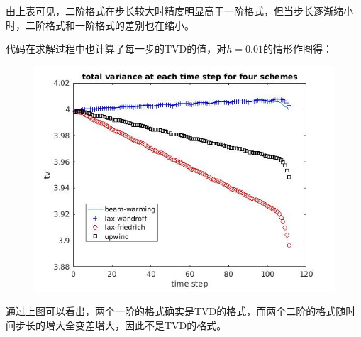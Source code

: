 \documentclass[12pt]{article}
\theoremstyle{remark}
\begin{document}
由上表可见，二阶格式在步长较大时精度明显高于一阶格式，但当步长逐渐缩小时，二阶格式和一阶格式的差别也在缩小。

代码在求解过程中也计算了每一步的TVD的值，对$h=0.01$的情形作图得：

\begin{figure}[!ht]
\centering
\includegraphics[width=400pt]{tvd.jpg}
\end{figure}

通过上图可以看出，两个一阶的格式确实是TVD的格式，而两个二阶的格式随时间步长的增大全变差增大，因此不是TVD的格式。
\end{document}
